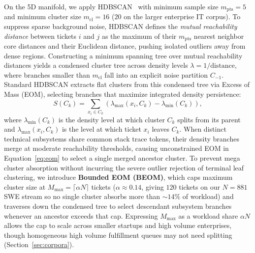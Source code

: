 \documentclass[sigconf,nonacm,pbalance]{acmart}
\begin{document}
On the 5D manifold, we apply HDBSCAN~\cite{campello2013density, mcinnes2017hdbscan} with minimum sample size $m_{\text{pts}} = 5$ and minimum cluster size $m_{\text{cl}} = 16$ ($20$ on the larger enterprise IT corpus). To suppress sparse background noise, HDBSCAN defines the \emph{mutual reachability distance} between tickets $i$ and $j$ as the maximum of their $m_{\text{pts}}$ nearest neighbor core distances and their Euclidean distance, pushing isolated outliers away from dense regions. Constructing a minimum spanning tree over mutual reachability distances yields a condensed cluster tree across density levels $\lambda = 1 / \text{distance}$, where branches smaller than $m_{\text{cl}}$ fall into an explicit noise partition $C_{-1}$. Standard HDBSCAN extracts flat clusters from this condensed tree via Excess of Mass (EOM), selecting branches that maximize integrated density persistence:
\begin{equation}
\label{eq:eom}
S(C_k) = \sum_{x_i \in C_k} \left( \lambda_{\text{max}}(x_i, C_k) - \lambda_{\text{min}}(C_k) \right),
\end{equation}
where $\lambda_{\text{min}}(C_k)$ is the density level at which cluster $C_k$ splits from its parent and $\lambda_{\text{max}}(x_i, C_k)$ is the level at which ticket $x_i$ leaves $C_k$. When distinct technical subsystems share common stack trace tokens, their density branches merge at moderate reachability thresholds, causing unconstrained EOM in Equation~\ref{eq:eom} to select a single merged ancestor cluster. To prevent mega cluster absorption without incurring the severe outlier rejection of terminal leaf clustering, we introduce \textbf{Bounded EOM (BEOM)}, which caps maximum cluster size at $M_{\max} = \lceil \alpha N \rceil$ tickets ($\alpha \approx 0.14$, giving $120$ tickets on our $N = 881$ SWE stream so no single cluster absorbs more than $\sim\!14\%$ of workload) and traverses down the condensed tree to select descendant subsystem branches whenever an ancestor exceeds that cap. Expressing $M_{\max}$ as a workload share $\alpha N$ allows the cap to scale across smaller startups and high volume enterprises, though homogeneous high volume fulfillment queues may not need splitting (Section~\ref{sec:corpora}).
\end{document}
